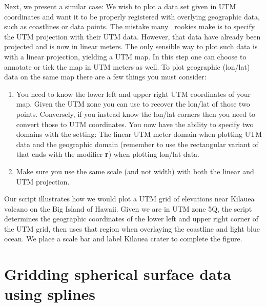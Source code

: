 Next, we present a similar case: We wish to plot a data set given in UTM coordinates and want it
to be properly registered with overlying geographic data, such as coastlines or data points.  The
mistake many \GMT\ rookies make is to specify the UTM projection with their UTM
data.  However, that data have already been projected and is now in linear meters.  The only
sensible way to plot such data is with a linear projection, yielding a UTM map.  In this step one can
choose to annotate or tick the map in UTM meters as well.  To plot geographic (lon/lat) data on
the same map there are a few things you must consider:
\begin{enumerate}
	\item You need to know the lower left and upper right UTM coordinates of your map. Given
	the UTM zone you can use  to recover the lon/lat of those two points.
	Conversely, if you instead know the lon/lat corners then you need to convert those
	to UTM coordinates.  You now have the ability to specify two domains with the  setting:
	The linear UTM meter domain when plotting UTM data and the geographic domain (remember to use the
	rectangular variant of  that ends with the modifier \textbf{r}) when plotting lon/lat data.
	\item Make sure you use the same scale (and not width) with both the linear and UTM projection.
\end{enumerate}


Our script illustrates how we would plot a UTM grid of elevations near Kilauea volcano on the Big Island
of Hawaii.  Given we are in UTM zone 5Q, the script determines the geographic coordinates of the
lower left and upper right corner of the UTM grid, then uses that region when overlaying the coastline
and light blue ocean.  We place a scale bar and label Kilauea crater to complete the figure.

 

\section{Gridding spherical surface data using splines}

